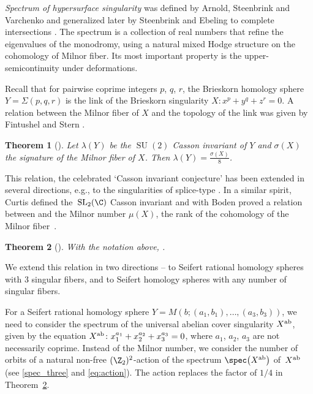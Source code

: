 \documentclass[10pt,a4paper]{amsart}
\newtheorem{Theorem}{Theorem}[section]
\begin{document}
\emph{Spectrum of hypersurface singularity} \cite{St85} was defined by Arnold, Steenbrink and Varchenko and generalized later by Steenbrink and Ebeling to complete intersections \cite{EbSt98}. The spectrum is a collection of real numbers that refine the eigenvalues of the monodromy, using a natural mixed Hodge structure on the cohomology of Milnor fiber. Its most important property is the upper-semicontinuity under deformations.

Recall that for pairwise coprime integers $p$, $q$, $r$, the Brieskorn homology sphere $Y = \Sigma(p, q, r)$ is the link of the Brieskorn singularity $X\colon x^p+y^q+z^r = 0$. A relation between the Milnor fiber of $X$ and the topology of the link was given by Fintushel and Stern \cite{FS90}.

\begin{Theorem}[{\cite[Theorem 2.10]{FS90}}]\label{thm:FS}
	Let $\lambda(Y)$ be the $\operatorname{SU}(2)$ Casson invariant of $Y$ and $\sigma(X)$ the signature of the Milnor fiber of $X$. Then
$\lambda(Y) = \frac{\sigma(X)}{8}$.
\end{Theorem}
This relation, the celebrated `Casson invariant conjecture' \cite{NeuWa90} has been extended in several directions, e.g., to the singularities of splice-type \cite{NeOk08}. In a similar spirit, Curtis \cite{Cu01} defined the~$\operatorname{SL}_2(\C)$ Casson invariant  and with Boden proved a relation between  and the Milnor number $\mu(X)$, the rank of the cohomology of the Milnor fiber~\cite{BC06}.

\begin{Theorem}[{\cite[Theorem~2.4.]{BC06}}]\label{CassonMilnorIntro}
With the notation above,
.
\end{Theorem}

We extend this relation in two directions -- to Seifert rational homology spheres with 3 singular fibers, and to Seifert homology spheres with any number of singular fibers.

For a Seifert rational homology sphere $Y = M(b;(a_1, b_1), \dots, (a_3,b_3))$, we need to consider the spectrum of the universal abelian cover singularity $X^{\rm ab}$, given by the equation
$
 X^{\rm ab}\colon x_1^{a_1}+x_2^{a_2}+x_3^{a_3}=0$,
where $a_1$, $a_2$, $a_3$ are not necessarily coprime. Instead of the Milnor number, we consider the number of orbits of a natural non-free $(\Z_2)^2$-action of the spectrum $\spec\bigl(X^{\rm ab}\bigr)$ of~$X^{\rm ab}$ (see \eqref{spec_three} and \eqref{eq:action}). The action replaces the factor of $1/4$ in Theorem~\ref{CassonMilnorIntro}.
\end{document}
